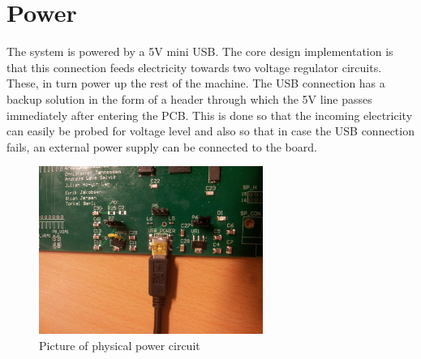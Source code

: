 \documentclass[../main/report.tex]{subfiles}
\begin{document}
\section{Power}

The system is powered by a 5V mini USB.
The core design implementation is that this connection feeds electricity towards two voltage regulator circuits.
These, in turn power up the rest of the machine.
The USB connection has a backup solution in the form of a header through which the 5V line passes immediately after entering the PCB.
This is done so that the incoming electricity can easily be probed for voltage level and also so that in case the USB connection fails, an external power supply can be connected to the board.

\begin{figure}[H]
	\centering
	\includegraphics[width=0.65\textwidth]{../pcb/assets/power.jpg}
	\caption{Picture of physical power circuit}
	\label{fig: power picture}
\end{figure}
\end{document}
